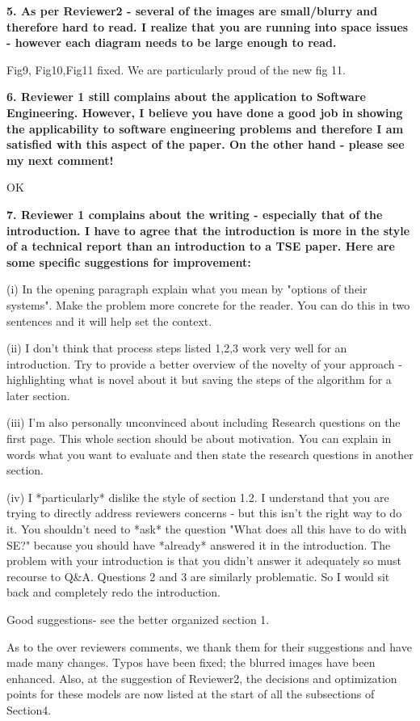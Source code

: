 \documentclass[10pt,journal,compsoc]{IEEEtran}
\begin{document}
{\bf  5. As per Reviewer2 - several of the images are small/blurry and therefore hard to read.  I realize that you are running into space issues - however each diagram needs to be large enough to read.}

Fig9, Fig10,Fig11 fixed. We are particularly proud of the new fig 11.

{\bf 6. Reviewer 1 still complains about the application to Software Engineering.  However, I believe you have done a good job in showing the applicability to software engineering problems and therefore I am satisfied with this aspect of the paper.  On the other hand - please see my next comment!}

OK
 
{\bf 7. Reviewer 1 complains about the writing - especially that of the introduction.  I have to agree that the introduction is more in the style of a technical report than an introduction to a TSE paper.  Here are some specific suggestions for improvement:

(i) In the opening paragraph explain what you mean by "options of their systems".  Make the problem more concrete for the reader.  You can do this in two sentences and it will help set the context.

(ii) I don't think that process steps listed 1,2,3 work very well for an introduction.  Try to provide a better overview of the novelty of your approach - highlighting what is novel about it but saving the steps of the algorithm for a later section.

(iii)  I'm also personally unconvinced about including Research questions on the first page.  This whole section should be about motivation.  You can explain in words what you want to evaluate and then state the research questions in another section.

(iv) I *particularly* dislike the style of section  1.2.  I understand that you are trying to directly address reviewers concerns - but this isn't the right way to do it.  You shouldn't need to *ask*  the question "What does all this have to do with SE?" because you should have *already* answered it in the introduction.  The problem with your introduction is that you didn't answer it adequately so must recourse to Q\&A.   Questions 2 and 3 are similarly problematic.  So I would sit back and completely redo the introduction.}

Good suggestions- see the  better organized section 1.

As to the over   reviewers  comments, we thank them for their suggestions and have made many changes.
Typos have been fixed; the blurred images have been enhanced.
Also, at the suggestion of Reviewer2,
the decisions and optimization points for these models are now listed at the start of all the subsections of Section4.
\end{document}
